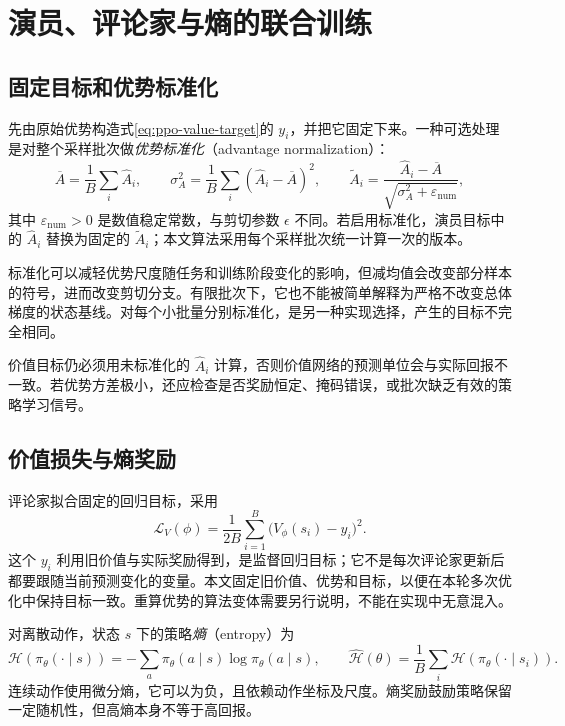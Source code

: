 \documentclass[UTF8,12pt,a4paper,fontset=fandol]{ctexart}
\begin{document}
\section{演员、评论家与熵的联合训练}
\label{sec:ppo-loss}

\subsection{固定目标和优势标准化}

先由原始优势构造式\eqref{eq:ppo-value-target}的 $y_i$，并把它固定下来。一种可选处理是对整个采样批次做\emph{优势标准化}（advantage normalization）：
\begin{equation}
  \overline A=\frac1B\sum_i\widehat A_i,\qquad
  \sigma_A^2=\frac1B\sum_i(\widehat A_i-\overline A)^2,\qquad
  \widetilde A_i=\frac{\widehat A_i-\overline A}
                      {\sqrt{\sigma_A^2+\varepsilon_{\mathrm{num}}}},
  \label{eq:ppo-advantage-normalization}
\end{equation}
其中 $\varepsilon_{\mathrm{num}}>0$ 是数值稳定常数，与剪切参数 $\epsilon$ 不同。若启用标准化，演员目标中的 $\widehat A_i$ 替换为固定的 $\widetilde A_i$；本文算法采用每个采样批次统一计算一次的版本。

标准化可以减轻优势尺度随任务和训练阶段变化的影响，但减均值会改变部分样本的符号，进而改变剪切分支。有限批次下，它也不能被简单解释为严格不改变总体梯度的状态基线。对每个小批量分别标准化，是另一种实现选择，产生的目标不完全相同。

价值目标仍必须用未标准化的 $\widehat A_i$ 计算，否则价值网络的预测单位会与实际回报不一致。若优势方差极小，还应检查是否奖励恒定、掩码错误，或批次缺乏有效的策略学习信号。

\subsection{价值损失与熵奖励}

评论家拟合固定的回归目标，采用
\begin{equation}
  \mathcal L_V(\phi)
  =\frac1{2B}\sum_{i=1}^B\bigl(V_\phi(s_i)-y_i\bigr)^2.
  \label{eq:ppo-value-loss}
\end{equation}
这个 $y_i$ 利用旧价值与实际奖励得到，是监督回归目标；它不是每次评论家更新后都要跟随当前预测变化的变量。本文固定旧价值、优势和目标，以便在本轮多次优化中保持目标一致。重算优势的算法变体需要另行说明，不能在实现中无意混入。

对离散动作，状态 $s$ 下的策略\emph{熵}（entropy）为
\begin{equation}
  \mathcal H(\pi_\theta(\cdot\mid s))
  =-\sum_a\pi_\theta(a\mid s)\log\pi_\theta(a\mid s),
  \qquad
  \widehat{\mathcal H}(\theta)
  =\frac1B\sum_i\mathcal H(\pi_\theta(\cdot\mid s_i)).
  \label{eq:ppo-entropy}
\end{equation}
连续动作使用微分熵，它可以为负，且依赖动作坐标及尺度。熵奖励鼓励策略保留一定随机性，但高熵本身不等于高回报。
\end{document}
